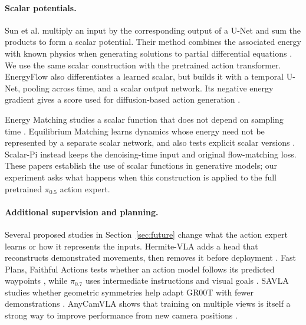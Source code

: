 \documentclass[10pt]{article}
\newcommand{\pihalf}{\pi_{0.5}}
\begin{document}
\paragraph{Scalar potentials.}
Sun et al. multiply an input by the corresponding output of a U-Net and sum the products to form a scalar potential. Their method combines the associated energy with known physics when generating solutions to partial differential equations \cite{composing}. We use the same scalar construction with the pretrained action transformer. EnergyFlow also differentiates a learned scalar, but builds it with a temporal U-Net, pooling across time, and a scalar output network. Its negative energy gradient gives a score used for diffusion-based action generation \cite{energyflow}.

Energy Matching studies a scalar function that does not depend on sampling time \cite{energymatching}. Equilibrium Matching learns dynamics whose energy need not be represented by a separate scalar network, and also tests explicit scalar versions \cite{eqm}. Scalar-Pi instead keeps the denoising-time input and original flow-matching loss. These papers establish the use of scalar functions in generative models; our experiment asks what happens when this construction is applied to the full pretrained $\pihalf$ action expert.

\paragraph{Additional supervision and planning.}
Several proposed studies in Section~\ref{sec:future} change what the action expert learns or how it represents the inputs. Hermite-VLA adds a head that reconstructs demonstrated movements, then removes it before deployment \cite{lv2026hermite}. Fast Plans, Faithful Actions tests whether an action model follows its predicted waypoints \cite{xie2026fastplans}, while $\pi_{0.7}$ uses intermediate instructions and visual goals \cite{physicalintelligence2026pi07}. SAVLA studies whether geometric symmetries help adapt GR00T with fewer demonstrations \cite{li2026savla}. AnyCamVLA shows that training on multiple views is itself a strong way to improve performance from new camera positions \cite{heo2026anycam}.
\end{document}
